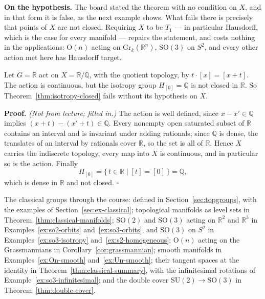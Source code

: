 \documentclass[11pt]{report}
\makeatletter
\newcounter{excounter}[section]
\renewenvironment{proof}[1][Proof]{\noindent\textbf{#1.} }{\hfill$\square$\par\vspace{5pt}}
\newcommand{\exlabel}[1]{\edef\@currentlabel{\arabic{section}.\arabic{excounter}}\label{#1}}
\newcommand{\Ogp}{\mathrm{O}}
\newcommand{\SO}{\mathrm{SO}}
\newcommand{\Gr}{\mathrm{Gr}}
\makeatother
\begin{document}
\textbf{On the hypothesis.} The board stated the theorem with no condition on $X$, and in that form it is false, as the next example shows. What fails there is precisely that points of $X$ are not closed. Requiring $X$ to be $T_1$ --- in particular Hausdorff, which is the case for every manifold --- repairs the statement, and costs nothing in the applications: $\Ogp(n)$ acting on $\Gr_k(\mathbb{R}^n)$, $\SO(3)$ on $S^2$, and every other action met here has Hausdorff target.

\begin{exbox}\exlabel{ex:isotropy-not-closed}
Let $G = \mathbb{R}$ act on $X = \mathbb{R}/\mathbb{Q}$, with the quotient topology, by $t \cdot [x] = [x+t]$. The action is continuous, but the isotropy group $H_{[0]} = \mathbb{Q}$ is not closed in $\mathbb{R}$. So Theorem~\ref{thm:isotropy-closed} fails without its hypothesis on $X$.
\end{exbox}

\begin{proof}
\textit{(Not from lecture; filled in.)} The action is well defined, since $x - x' \in \mathbb{Q}$ implies $(x+t) - (x'+t) \in \mathbb{Q}$. Every nonempty open saturated subset of $\mathbb{R}$ contains an interval and is invariant under adding rationals; since $\mathbb{Q}$ is dense, the translates of an interval by rationals cover $\mathbb{R}$, so the set is all of $\mathbb{R}$. Hence $X$ carries the indiscrete topology, every map into $X$ is continuous, and in particular so is the action. Finally
\[
H_{[0]} = \{\, t \in \mathbb{R} \mid [t] = [0] \,\} = \mathbb{Q},
\]
which is dense in $\mathbb{R}$ and not closed.
\end{proof}

The classical groups through the course: defined in Section~\ref{sec:topgroups}, with the examples of Section~\ref{sec:ex-classical}; topological manifolds as level sets in Theorem~\ref{thm:classical-manifolds}; $\SO(2)$ and $\SO(3)$ acting on $\mathbb{R}^2$ and $\mathbb{R}^3$ in Examples~\ref{ex:so2-orbits} and~\ref{ex:so3-orbits}, and $\SO(3)$ on $S^2$ in Examples~\ref{ex:so3-isotropy} and~\ref{ex:s2-homogeneous}; $\Ogp(n)$ acting on the Grassmannians in Corollary~\ref{cor:grassmannian}; smooth manifolds in Examples~\ref{ex:On-smooth} and~\ref{ex:Un-smooth}; their tangent spaces at the identity in Theorem~\ref{thm:classical-summary}, with the infinitesimal rotations of Example~\ref{ex:so3-infinitesimal}; and the double cover $\mathrm{SU}(2) \to \SO(3)$ in Theorem~\ref{thm:double-cover}.
\end{document}

